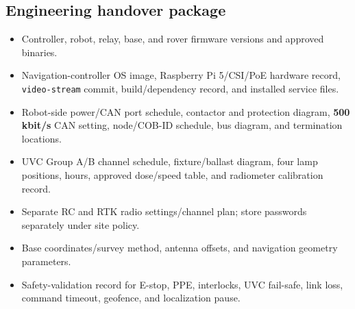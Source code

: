 \documentclass[
  10pt,
  letterpaper,
  openany]{report}
\providecommand{\tightlist}{%
  \setlength{\itemsep}{0pt}\setlength{\parskip}{0pt}}
\begin{document}
\subsection{Engineering handover
package}\label{engineering-handover-package}

\begin{itemize}
\tightlist
\item
  Controller, robot, relay, base, and rover firmware versions and
  approved binaries.
\item
  Navigation-controller OS image, Raspberry Pi 5/CSI/PoE hardware
  record, \texttt{video-stream} commit, build/dependency record, and
  installed service files.
\item
  Robot-side power/CAN port schedule, contactor and protection diagram,
  \textbf{500 kbit/s} CAN setting, node/COB-ID schedule, bus diagram,
  and termination locations.
\item
  UVC Group A/B channel schedule, fixture/ballast diagram, four lamp
  positions, hours, approved dose/speed table, and radiometer
  calibration record.
\item
  Separate RC and RTK radio settings/channel plan; store passwords
  separately under site policy.
\item
  Base coordinates/survey method, antenna offsets, and navigation
  geometry parameters.
\item
  Safety-validation record for E-stop, PPE, interlocks, UVC fail-safe,
  link loss, command timeout, geofence, and localization pause.
\end{itemize}
\end{document}
